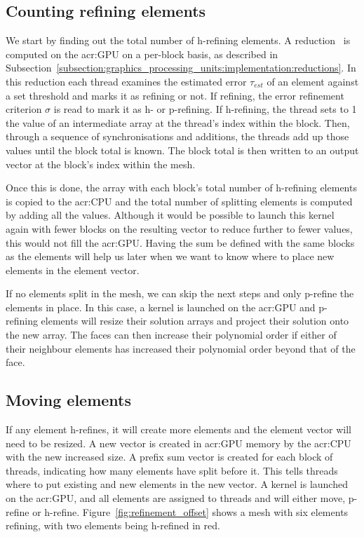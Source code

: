 \subsection{Counting refining elements}\label{subsection:adaptive_mesh_refinement:implementation:counting_refining_elements}

We start by finding out the total number of h-refining elements. A reduction~\cite{Harris2007} is
computed on the \acrshort{acr:GPU} on a per-block basis, as described in
Subsection~\ref{subsection:graphics_processing_units:implementation:reductions}. In this reduction
each thread examines the estimated error \(\tau_{est}\) of an element against a set threshold and
marks it as refining or not. If refining, the error refinement criterion \(\sigma \) is read to mark
it as h- or p-refining. If h-refining, the thread sets to 1 the value of an intermediate array at the
thread's index within the block. Then, through a sequence of synchronisations and additions, the
threads add up those values until the block total is known. The block total is then written to an
output vector at the block's index within the mesh.

Once this is done, the array with each block's total number of h-refining elements is copied to the
\acrshort{acr:CPU} and the total number of splitting elements is computed by adding all the values.
Although it would be possible to launch this kernel again with fewer blocks on the resulting vector
to reduce further to fewer values, this would not fill the \acrshort{acr:GPU}. Having the sum be
defined with the same blocks as the elements will help us later when we want to know where to place
new elements in the element vector.

If no elements split in the mesh, we can skip the next steps and only p-refine the elements in
place. In this case, a kernel is launched on the \acrshort{acr:GPU} and p-refining elements will
resize their solution arrays and project their solution onto the new array. The faces can then
increase their polynomial order if either of their neighbour elements has increased their polynomial
order beyond that of the face. 

\subsection{Moving elements}\label{subsection:adaptive_mesh_refinement:implementation:moving_elements}

If any element h-refines, it will create more elements and the element vector will need to be
resized. A new vector is created in \acrshort{acr:GPU} memory by the \acrshort{acr:CPU} with the new
increased size. A prefix sum vector is created for each block of threads, indicating how many
elements have split before it. This tells threads where to put existing and new elements in the new
vector. A kernel is launched on the \acrshort{acr:GPU}, and all elements are assigned to threads and
will either move, p-refine or h-refine. Figure~\ref{fig:refinement_offset} shows a mesh with six
elements refining, with two elements being h-refined in red.


